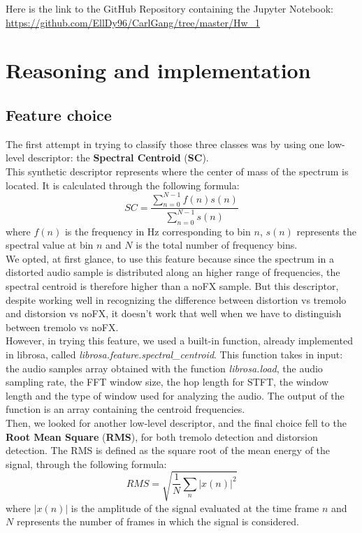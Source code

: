 \documentclass[a4paper,12pt]{report}
\begin{document}
Here is the link to the GitHub Repository containing the Jupyter Notebook: \url{https://github.com/EllDy96/CarlGang/tree/master/Hw_1}
\endabstract{}

\chapter{Reasoning and implementation}
\section{Feature choice}
The first attempt in trying to classify those three classes was by using one low-level descriptor: the \textbf{Spectral Centroid} (\textbf{SC}).
\\This synthetic descriptor represents where the center of mass of the spectrum is located. It is calculated through the following formula:
\[ SC =\frac{\sum_{n=0}^{N-1}f(n)s(n)}{\sum_{n=0}^{N-1}s(n)}  \] where $f(n)$ is the frequency in Hz corresponding to bin $n$, $s(n)$ represents the spectral value at bin $n$ and $N$ is the total number of frequency bins.
\\We opted, at first glance, to use this feature because since the spectrum in a distorted audio sample is distributed along an higher range of frequencies, the spectral centroid is therefore higher than a noFX sample. But this descriptor, despite working well in recognizing the difference between distortion vs tremolo and distorsion vs noFX, it doesn't work that well when we have to distinguish between tremolo vs noFX.
\\However, in trying this feature, we used a built-in function, already implemented in librosa, called \emph{librosa.feature.spectral\_centroid}. This function takes in input: the audio samples array obtained with the function \emph{librosa.load}, the audio sampling rate, the FFT window size, the hop length for STFT, the window length and the type of window used for analyzing the audio. The output of the function is an array containing the centroid frequencies.
\\Then, we looked for another low-level descriptor, and the final choice fell to the \textbf{Root Mean Square} (\textbf{RMS}), for both tremolo detection and distorsion detection. 
The RMS is defined as the square root of the mean energy of the signal, through the following formula:
\[ RMS =\sqrt{\frac{1}{N}\sum_{n}^{}|x(n)|^2}  \] where $|x(n)|$ is the amplitude of the signal evaluated at the time frame $n$ and $N$ represents the number of frames in which the signal is considered.
\end{document}
